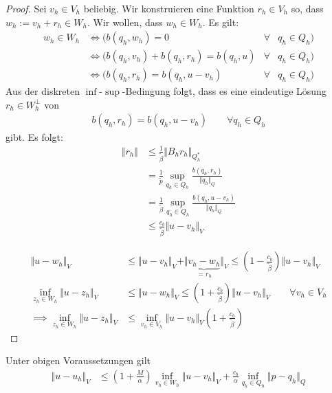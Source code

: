\begin{proof}
	Sei $v_h\in V_h$ beliebig.
	Wir konstruieren eine Funktion $r_h\in V_h$ so, dass $w_h:=v_h+r_h\in W_h$.
	Wir wollen, dass $w_h\in W_h$.
	Es gilt:
	\begin{align*}
		w_h\in W_h
		&\Longleftrightarrow \Big(b(q_h,w_h)=0\qquad&\forall& q_h\in Q_h\Big)\\
		&\Longleftrightarrow \Big(b(q_h,v_h)+b(q_h,r_h)=b(q_h,u) &\forall&q_h\in Q_h\Big)\\
		&\Longleftrightarrow\Big( b(q_h,r_h)=b(q_h,u-v_h) &\forall&q_h\in Q_h\Big)
	\end{align*}
	Aus der diskreten $\inf$-$\sup$-Bedingung folgt, dass es eine eindeutige Lösung $r_h\in W_h^\perp$ von
	\begin{align*}
		b(q_h,r_h)=b(q_h,u-v_h)\qquad\forall q_h\in Q_h
	\end{align*}
	gibt. Es folgt:
	\begin{align*}
		\Vert r_h\Vert&\leq\frac{1}{\tilde{\beta}}\Vert B_h r_h\Vert_{Q_h^\ast}\\
		&=\frac{1}{\tilde{p}}\sup\limits_{q_h\in Q_h}\frac{b(q_h,r_h)}{\Vert q_h\Vert_Q}\\
		&=\frac{1}{\tilde{\beta}}\sup\limits_{q_h\in Q_h}\frac{b(q_h,u-v_h)}{\Vert q_h\Vert_Q}\\
		&\leq\frac{c_b}{\tilde{\beta}}\Vert u-v_h\Vert_V
	\end{align*}

	\begin{align*}
		\Vert u-w_h\Vert_V
		&\leq\Vert u-v_h\Vert_V+\Vert\underbrace{v_h-w_h}_{=r_h}\Vert_V
		\leq\left(1-\frac{c_b}{\tilde{\beta}}\right)\Vert u-v_h\Vert_V\\
		\inf\limits_{z_h\in W_h}\Vert u-z_h\Vert_V
		&\leq\Vert u-w_h\Vert_V
		\leq\left(1+\frac{c_b}{\tilde{\beta}}\right)\Vert u-v_h\Vert_V\qquad\forall v_h\in V_h\\
		\implies
		\inf\limits_{z_h\in W_h}\Vert u-z_h\Vert_V
		&\leq\inf\limits_{v_h\in V_h}\Vert u-v_h\Vert_V\left(1+\frac{c_b}{\tilde{\beta}}\right)
	\end{align*}
\end{proof}

\begin{theorem} %
	Unter obigen Voraussetzungen gilt
	\begin{align*}
		\Vert u-u_h\Vert_V&\leq\left(1+\frac{M}{\alpha}\right)\inf\limits_{v_h\in W_h}\Vert u-v_h\Vert_V+\frac{c_b}{\alpha}\inf\limits_{q_h\in Q_h}\Vert p-q_h\Vert_Q
	\end{align*}
\end{theorem}

